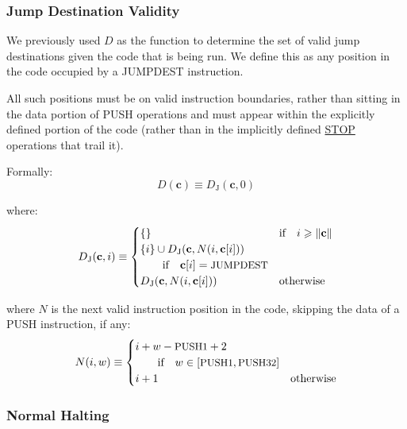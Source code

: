 \documentclass[9pt,oneside]{amsart}
\makeatletter
\newcommand{\linkdest}[1]{\Hy@raisedlink{\hypertarget{#1}{}}}
\makeatother
\begin{document}
\begin{multicols}{2}
\subsubsection{Jump Destination Validity}

We previously used $D$ as the function to determine the set of valid jump destinations given the code that is being run. We define this as any position in the code occupied by a {\small JUMPDEST} instruction.

All such positions must be on valid instruction boundaries, rather than sitting in the data portion of {\small PUSH} operations and must appear within the explicitly defined portion of the code (rather than in the implicitly defined \hyperlink{stop}{{\small STOP}} operations that trail it).

Formally:
\begin{equation}
D(\mathbf{c}) \equiv D_{\mathrm{J}}(\mathbf{c}, 0)
\end{equation}

where:
\begin{equation}
D_{\mathrm{J}}(\mathbf{c}, i) \equiv \begin{cases}
\{\} & \text{if} \quad i \geqslant \lVert \mathbf{c} \rVert  \\
\{ i \} \cup D_{\mathrm{J}}(\mathbf{c}, N(i, \mathbf{c}[i])) & \\
\quad\quad\text{if} \quad \mathbf{c}[i] = \text{\small JUMPDEST} \\
D_{\mathrm{J}}(\mathbf{c}, N(i, \mathbf{c}[i])) & \text{otherwise} \\
\end{cases}
\end{equation}

where $N$ is the next valid instruction position in the code, skipping the data of a {\small PUSH} instruction, if any:
\begin{equation}
N(i, w) \equiv \begin{cases}
i + w - \text{\small PUSH1} + 2 & \\
\quad\quad\text{if} \quad w \in [\text{\small PUSH1}, \text{\small PUSH32}] \\
i + 1 & \text{otherwise} \end{cases}
\end{equation}

\subsubsection{Normal Halting}\hypertarget{normal_halting_function_H}{}\linkdest{hhalt}


\end{multicols}
\end{document}
